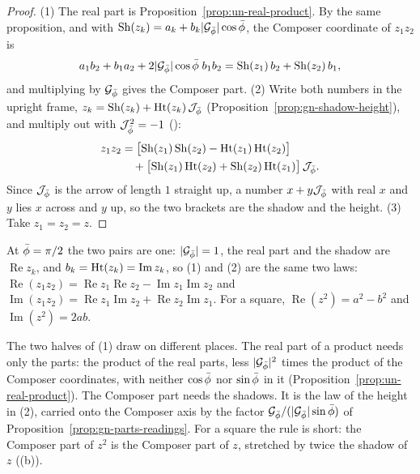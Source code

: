 \begin{proof}
(1) The real part is Proposition~\ref{prop:un-real-product}. By the same proposition, and with $\operatorname{Sh}(z_k) = a_k + b_k|\mathcal{G}_{\bar{\phi}}|\cos\bar{\phi}$, the Composer coordinate of $z_1z_2$ is
\[
a_1b_2 + b_1a_2 + 2|\mathcal{G}_{\bar{\phi}}|\cos\bar{\phi}\;b_1b_2 = \operatorname{Sh}(z_1)\,b_2 + \operatorname{Sh}(z_2)\,b_1 ,
\]
and multiplying by $\mathcal{G}_{\bar{\phi}}$ gives the Composer part. (2) Write both numbers in the upright frame, $z_k = \operatorname{Sh}(z_k) + \operatorname{Ht}(z_k)\,\mathcal{J}_{\bar{\phi}}$ (Proposition~\ref{prop:gn-shadow-height}), and multiply out with $\mathcal{J}_{\bar{\phi}}^2 = -1$ ():
\begin{align*}
z_1z_2 &= \bigl[\operatorname{Sh}(z_1)\operatorname{Sh}(z_2) - \operatorname{Ht}(z_1)\operatorname{Ht}(z_2)\bigr] \\
&\quad + \bigl[\operatorname{Sh}(z_1)\operatorname{Ht}(z_2) + \operatorname{Sh}(z_2)\operatorname{Ht}(z_1)\bigr]\,\mathcal{J}_{\bar{\phi}} .
\end{align*}
Since $\mathcal{J}_{\bar{\phi}}$ is the arrow of length $1$ straight up, a number $x + y\mathcal{J}_{\bar{\phi}}$ with real $x$ and $y$ lies $x$ across and $y$ up, so the two brackets are the shadow and the height. (3) Take $z_1 = z_2 = z$.
\end{proof}

\incomplex At $\bar{\phi} = \pi/2$ the two pairs are one: $|\mathcal{G}_{\bar{\phi}}| = 1$, the real part and the shadow are $\operatorname{Re} z_k$, and $b_k = \operatorname{Ht}(z_k) = \operatorname{Im} z_k$, so (1) and (2) are the same two laws: $\operatorname{Re}(z_1z_2) = \operatorname{Re} z_1\operatorname{Re} z_2 - \operatorname{Im} z_1\operatorname{Im} z_2$ and $\operatorname{Im}(z_1z_2) = \operatorname{Re} z_1\operatorname{Im} z_2 + \operatorname{Re} z_2\operatorname{Im} z_1$. For a square, $\operatorname{Re}(z^2) = a^2 - b^2$ and $\operatorname{Im}(z^2) = 2ab$.

\begin{plainwords}
The two halves of (1) draw on different places. The real part of a product needs only the parts: the product of the real parts, less $|\mathcal{G}_{\bar{\phi}}|^2$ times the product of the Composer coordinates, with neither $\cos\bar{\phi}$ nor $\sin\bar{\phi}$ in it (Proposition~\ref{prop:un-real-product}). The Composer part needs the shadows. It is the law of the height in (2), carried onto the Composer axis by the factor $\mathcal{G}_{\bar{\phi}}/(|\mathcal{G}_{\bar{\phi}}|\sin\bar{\phi})$ of Proposition~\ref{prop:gn-parts-readings}. For a square the rule is short: the Composer part of $z^2$ is the Composer part of $z$, stretched by twice the shadow of $z$ ((b)).
\end{plainwords}

